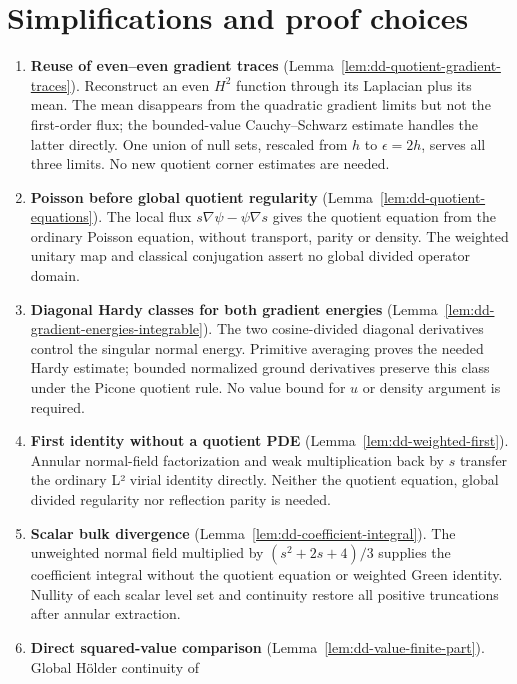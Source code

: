 \section*{Simplifications and proof choices}
\begin{enumerate}
  \item \textbf{Reuse of even--even gradient traces}
        (Lemma~\ref{lem:dd-quotient-gradient-traces}). Reconstruct an even
        $H^2$ function through its Laplacian plus its mean. The mean disappears
        from the quadratic gradient limits but not the first-order flux;
        the bounded-value Cauchy--Schwarz estimate handles the latter directly.
        One union of null sets, rescaled from $h$ to $\epsilon=2h$, serves all
        three limits. No new quotient corner estimates are needed.
  \item \textbf{Poisson before global quotient regularity}
        (Lemma~\ref{lem:dd-quotient-equations}). The local flux
        $s\nabla\psi-\psi\nabla s$ gives the quotient equation from the
        ordinary Poisson equation, without transport, parity or density.
        The weighted unitary map and classical conjugation assert no
        global divided operator domain.
  \item \textbf{Diagonal Hardy classes for both gradient energies}
        (Lemma~\ref{lem:dd-gradient-energies-integrable}). The two
        cosine-divided diagonal derivatives control the singular normal
        energy. Primitive averaging proves the needed Hardy estimate;
        bounded normalized ground derivatives preserve this class under
        the Picone quotient rule. No value bound for $u$ or density
        argument is required.
  \item \textbf{First identity without a quotient PDE}
        (Lemma~\ref{lem:dd-weighted-first}). Annular normal-field factorization
        and weak multiplication back by $s$ transfer the ordinary L² virial
        identity directly. Neither the quotient equation, global divided
        regularity nor reflection parity is needed.
  \item \textbf{Scalar bulk divergence}
        (Lemma~\ref{lem:dd-coefficient-integral}). The unweighted normal field
        multiplied by $(s^2+2s+4)/3$ supplies the coefficient integral without
        the quotient equation or weighted Green identity. Nullity of each
        scalar level set and continuity restore all positive truncations
        after annular extraction.
  \item \textbf{Direct squared-value comparison}
        (Lemma~\ref{lem:dd-value-finite-part}). Global H\"older continuity of

\end{enumerate}
